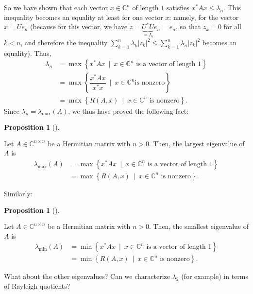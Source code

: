 \documentclass[numbers=enddot,12pt,final,onecolumn,notitlepage]{scrartcl}%
\numberwithin{exer}{subsection}
\theoremstyle{definition}
\newtheorem{prop}[theo]{Proposition}
\newenvironment{proposition}[1][]
{\begin{prop}[#1]\begin{leftbar}}
{\end{leftbar}\end{prop}}
\let\sumnonlimits\sum
\renewcommand{\sum}{\sumnonlimits\limits}
\begin{document}
So we have shown that each vector $x\in\mathbb{C}^{n}$ of length $1$ satisfies
$x^{\ast}Ax\leq\lambda_{n}$. This inequality becomes an equality at least for
one vector $x$: namely, for the vector $x=Ue_{n}$ (because for this vector, we
have $z=\underbrace{U^{\ast}U}_{=I_{n}}e_{n}=e_{n}$, so that $z_{k}=0$ for all
$k<n$, and therefore the inequality $\sum_{k=1}^{n}\lambda_{k}\left\vert
z_{k}\right\vert ^{2}\leq\sum_{k=1}^{n}\lambda_{n}\left\vert z_{k}\right\vert
^{2}$ becomes an equality). Thus,%
\begin{align*}
\lambda_{n}  &  =\max\left\{  x^{\ast}Ax\ \mid\ x\in\mathbb{C}^{n}\text{ is a
vector of length }1\right\} \\
&  =\max\left\{  \dfrac{x^{\ast}Ax}{x^{\ast}x}\ \mid\ x\in\mathbb{C}^{n}\text{
is nonzero}\right\} \\
&  =\max\left\{  R\left(  A,x\right)  \ \mid\ x\in\mathbb{C}^{n}\text{ is
nonzero}\right\}  .
\end{align*}
Since $\lambda_{n}=\lambda_{\max}\left(  A\right)  $, we thus have proved the
following fact:

\begin{proposition}
Let $A\in\mathbb{C}^{n\times n}$ be a Hermitian matrix with $n>0$. Then, the
largest eigenvalue of $A$ is%
\begin{align*}
\lambda_{\max}\left(  A\right)   &  =\max\left\{  x^{\ast}Ax\ \mid
\ x\in\mathbb{C}^{n}\text{ is a vector of length }1\right\} \\
&  =\max\left\{  R\left(  A,x\right)  \ \mid\ x\in\mathbb{C}^{n}\text{ is
nonzero}\right\}  .
\end{align*}

\end{proposition}

Similarly:

\begin{proposition}
Let $A\in\mathbb{C}^{n\times n}$ be a Hermitian matrix with $n>0$. Then, the
smallest eigenvalue of $A$ is%
\begin{align*}
\lambda_{\min}\left(  A\right)   &  =\min\left\{  x^{\ast}Ax\ \mid
\ x\in\mathbb{C}^{n}\text{ is a vector of length }1\right\} \\
&  =\min\left\{  R\left(  A,x\right)  \ \mid\ x\in\mathbb{C}^{n}\text{ is
nonzero}\right\}  .
\end{align*}

\end{proposition}

What about the other eigenvalues? Can we characterize $\lambda_{2}$ (for
example) in terms of Rayleigh quotients?
\end{document}
